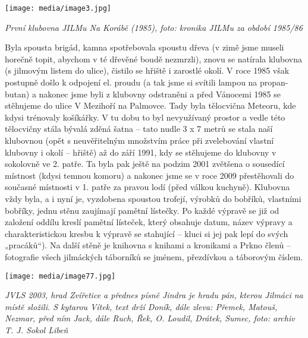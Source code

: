 \texttt{[image: media/image3.jpg]}

\emph{První klubovna JILMu Na Korábě (1985), foto: kronika JILMu za
období 1985/86}

Byla spousta brigád, kamna spotřebovala spoustu dřeva (v zimě jsme
museli horečně topit, abychom v té dřevěné boudě nezmrzli), znovu se
natírala klubovna (s jilmovým listem do ulice), čistilo se hřiště i
zarostlé okolí. V roce 1985 však postupně došlo k odpojení el. proudu (a
tak jsme si svítili lampou na propan-butan) a nakonec jsme byli z
klubovny odstraněni a před Vánocemi 1985 se stěhujeme do ulice V
Mezihoří na Palmovce. Tady byla tělocvična Meteoru, kde kdysi trénovaly
košíkářky. V tu dobu to byl nevyužívaný prostor a vedle této tělocvičny
stála bývalá zděná šatna -- tato nudle 3 x 7 metrů se stala naší
klubovnou (opět s neuvěřitelným množstvím práce při zvelebování vlastní
klubovny i okolí -- hřiště) až do září 1991, kdy se stěhujeme do
klubovny v sokolovně ve 2. patře. Ta byla pak ještě na podzim 2001
zvětšena o sousedící místnost (kdysi temnou komoru) a nakonec jsme se v
roce 2009 přestěhovali do současné místnosti v 1. patře za pravou lodí
(před válkou kuchyně). Klubovna vždy byla, a i nyní je, vyzdobena
spoustou trofejí, výrobků do bobříků, vlastními bobříky, jednu stěnu
zaujímají pamětní lístečky. Po každé výpravě se již od založení oddílu
kreslí pamětní lísteček, který obsahuje datum, název výpravy a
charakteristickou kresbu k výpravě se stahující -- kluci si jej pak lepí
do svých „pracáků``). Na další stěně je knihovna s knihami a kronikami a
Prkno členů -- fotografie všech jilmáckých táborníků se jménem,
přezdívkou a táborovým číslem.

\texttt{[image: media/image77.jpg]}

\emph{JVLS 2003, hrad Zvířetice a přednes písně Jindra je hradu pán,
kterou Jilmáci na místě složili. S kytarou Vítek, text drží Doník, dále
zleva: Přemek, Matouš, Nezmar, před ním Jack, dále Ruch, Řek, O. Loudil,
Drátek, Sumec, foto: archiv T. J. Sokol Libeň}


